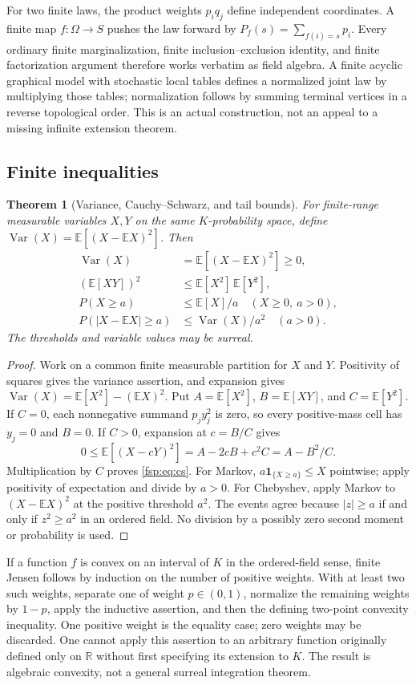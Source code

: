 \documentclass[11pt,a4paper]{article}
\numberwithin{equation}{section}
\newtheorem{theorem}{Theorem}[section]
\theoremstyle{definition}
\theoremstyle{remark}
\newcommand{\R}{\mathbb R}
\newcommand{\E}{\mathbb E}
\newcommand{\Var}{\operatorname{Var}}
\newcommand{\ind}{\mathbf 1}
\begin{document}
For two finite laws, the product weights $p_iq_j$ define independent
coordinates. A finite map $f:\Omega\to S$ pushes the law forward by
$P_f(s)=\sum_{f(i)=s}p_i$. Every ordinary finite marginalization, finite
inclusion--exclusion identity, and finite factorization argument therefore
works verbatim as field algebra. A finite acyclic graphical model with
stochastic local tables defines a normalized joint law by multiplying
those tables; normalization follows by summing terminal vertices in a
reverse topological order. This is an actual construction, not an appeal
to a missing infinite extension theorem.

\subsection{Finite inequalities}

\begin{theorem}[Variance, Cauchy--Schwarz, and tail bounds]
\label{fsp:thm:finitebounds}
For finite-range measurable variables $X,Y$ on the same $K$-probability
space, define $\Var(X)=\E[(X-\E X)^2]$. Then
\begin{align}
 \Var(X)&=\E[(X-\E X)^2]\ge0,\\
 (\E[XY])^2&\le\E[X^2]\,\E[Y^2],\label{fsp:eq:cs}\\
 P(X\ge a)&\le\E[X]/a\quad(X\ge0,\ a>0),\label{fsp:eq:markov}\\
 P(|X-\E X|\ge a)&\le\Var(X)/a^2\quad(a>0).
\end{align}
The thresholds and variable values may be surreal.
\end{theorem}
\begin{proof}
Work on a common finite measurable partition for $X$ and $Y$.
Positivity of squares gives the variance assertion, and expansion gives
$\Var(X)=\E[X^2]-(\E X)^2$. Put
$A=\E[X^2]$, $B=\E[XY]$, and $C=\E[Y^2]$.
If $C=0$, each nonnegative summand $p_jy_j^2$ is zero, so every
positive-mass cell has $y_j=0$ and $B=0$.
If $C>0$, expansion at $c=B/C$ gives
\[
 0\le\E[(X-cY)^2]=A-2cB+c^2C=A-B^2/C.
\]
Multiplication by $C$ proves \eqref{fsp:eq:cs}.
For Markov, $a\ind_{\{X\ge a\}}\le X$ pointwise; apply positivity
of expectation and divide by $a>0$.
For Chebyshev, apply Markov to $(X-\E X)^2$ at the positive threshold
$a^2$. The events agree because $|z|\ge a$ if and only if $z^2\ge a^2$
in an ordered field. No division by a possibly zero second moment or
probability is used.
\end{proof}

If a function $f$ is convex on an interval of $K$ in the ordered-field
sense, finite Jensen follows by induction on the number of positive
weights. With at least two such weights, separate one of weight $p\in(0,1)$,
normalize the remaining weights by $1-p$, apply the inductive assertion,
and then the defining two-point convexity inequality. One positive weight
is the equality case; zero weights may be discarded. One cannot apply this
assertion to an arbitrary function
originally defined only on $\R$ without first specifying its extension to
$K$. The result is algebraic convexity, not a general surreal integration
theorem.
\end{document}
